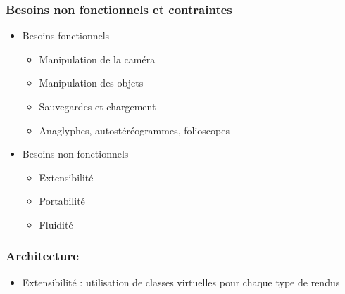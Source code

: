 \documentclass{beamer}
\begin{document}
\begin{frame}
\frametitle{Besoins non fonctionnels et contraintes}
\begin{itemize}[label=$\bullet$]
\item Besoins fonctionnels
	\begin{itemize}[label=$\circ$]
	\item Manipulation de la caméra
	\item Manipulation des objets
	\item Sauvegardes et chargement
	\item Anaglyphes, autostéréogrammes, folioscopes
	\end{itemize}
\item Besoins non fonctionnels
	\begin{itemize}[label=$\circ$]
	\item Extensibilité
	\item Portabilité
	\item Fluidité
	\end{itemize}
\end{itemize}
\end{frame}

% 

\begin{frame}
\frametitle{Architecture}
\begin{itemize}[label=$\bullet$]
\item Extensibilité : utilisation de classes virtuelles pour chaque type de rendus
\end{itemize}
\end{frame}


%

\end{document}
